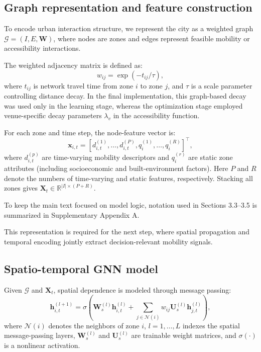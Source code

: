 \documentclass[final,5p,times,twocolumn,authoryear]{elsarticle}
\begin{document}
\subsection{Graph representation and feature construction}

To encode urban interaction structure, we represent the city as a weighted graph
$\mathcal{G}=(I,E,\mathbf{W})$, where nodes are zones and edges represent feasible mobility
or accessibility interactions.

The weighted adjacency matrix is defined as:
\begin{equation}
w_{ij}=\exp(-t_{ij}/\tau),
\label{eq:adjacency}
\end{equation}
where $t_{ij}$ is network travel time from zone $i$ to zone $j$, and $\tau$ is a scale
parameter controlling distance decay. In the final implementation, this graph-based decay was
used only in the learning stage, whereas the optimization stage employed venue-specific decay
parameters $\lambda_v$ in the accessibility function.

For each zone and time step, the node-feature vector is:
\begin{equation}
\mathbf{x}_{i,t} = \left[d_{i,t}^{(1)},\ldots,d_{i,t}^{(P)},q_i^{(1)},\ldots,q_i^{(R)}\right]^\top,
\label{eq:features}
\end{equation}
where $d_{i,t}^{(p)}$ are time-varying mobility descriptors and $q_i^{(r)}$ are static zone
attributes (including socioeconomic and built-environment factors). Here $P$ and $R$ denote
the numbers of time-varying and static features, respectively. Stacking all zones gives
$\mathbf{X}_t\in\mathbb{R}^{|I|\times(P+R)}$.

To keep the main text focused on model logic, notation used in Sections 3.3--3.5 is
summarized in Supplementary Appendix A.

This representation is required for the next step, where spatial propagation and temporal
encoding jointly extract decision-relevant mobility signals.

\subsection{Spatio-temporal GNN model}

Given $\mathcal{G}$ and $\mathbf{X}_t$, spatial dependence is modeled through message passing:
\begin{equation}
\mathbf{h}_{i,t}^{(l+1)} = \sigma\left(
\mathbf{W}_s^{(l)}\mathbf{h}_{i,t}^{(l)} + \sum_{j\in\mathcal{N}(i)} w_{ij}\mathbf{U}_s^{(l)}\mathbf{h}_{j,t}^{(l)}
\right),
\label{eq:spatial_layer}
\end{equation}
where $\mathcal{N}(i)$ denotes the neighbors of zone $i$, $l=1,\ldots,L$ indexes the spatial
message-passing layers, $\mathbf{W}_s^{(l)}$ and $\mathbf{U}_s^{(l)}$ are trainable weight
matrices, and $\sigma(\cdot)$ is a nonlinear activation.
\end{document}
